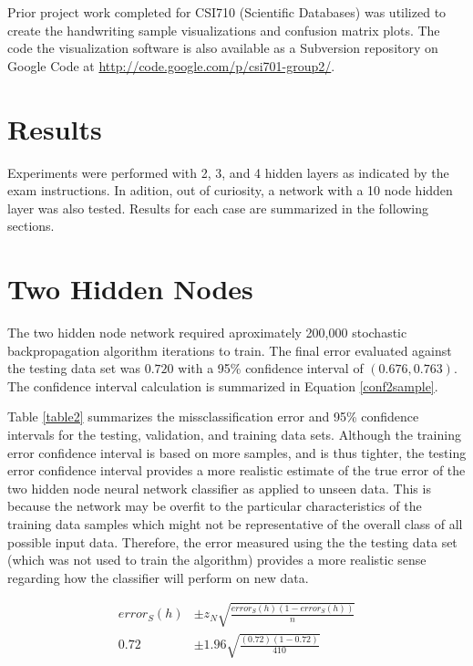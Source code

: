 \documentclass{article}
\begin{document}
Prior project work completed for CSI710 (Scientific Databases) was utilized to create the handwriting sample visualizations and confusion matrix plots. The code the visualization software is also available as a Subversion repository on Google Code at \url{http://code.google.com/p/csi701-group2/}.

\section{Results}\label{Results}

Experiments were performed with 2, 3, and 4 hidden layers as indicated by the exam instructions. In adition, out of curiosity, a network with a 10 node hidden layer was also tested. Results for each case are summarized in the following sections.

\section{Two Hidden Nodes}\label{hidden2}

The two hidden node network required aproximately 200,000 stochastic backpropagation algorithm iterations to train. The final error evaluated against the testing data set was \(0.720\) with a 95\% confidence interval of \((0.676 , 0.763)\). The confidence interval calculation is summarized in Equation \ref{conf2sample}.

Table \ref{table2} summarizes the missclassification error and 95\% confidence intervals for the testing, validation, and training data sets. Although the training error confidence interval is based on more samples, and is thus tighter, the testing error confidence interval provides a more realistic estimate of the true error of the two hidden node neural network classifier as applied to unseen data. This is because the network may be overfit to the particular characteristics of the training data samples which might not be representative of the overall class of all possible input data. Therefore, the error measured using the the testing data set (which was not used to train the algorithm) provides a more realistic sense regarding how the classifier will perform on new data. 

\begin{equation}\label{conf2sample}
\begin{split}
error_{S}(h) &\pm z_{N}\sqrt{\frac{error_{S}(h)(1-error_{S}(h))}{n}} \\
0.72 &\pm 1.96\sqrt{\frac{(0.72)(1-0.72)}{410}} 
\end{split}
\end{equation}
\end{document}
